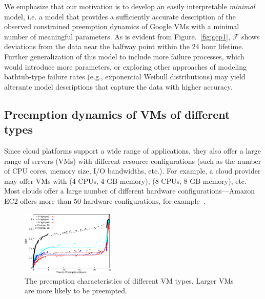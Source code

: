 We emphasize that our motivation is to develop an easily interpretable \emph{minimal} model, i.e. a model that provides a sufficiently accurate description of the observed constrained preemption dynamics of Google VMs with a minimal number of meaningful parameters.
As is evident from Figure.~\ref{fig:gcp1}, $\mathscr{F}$ shows deviations from the data near the halfway point within the 24 hour lifetime. Further generalization of this model to include more failure processes, which would introduce more parameters, or exploring other approaches of modeling bathtub-type failure rates (e.g., exponential Weibull distributions) \cite{mudholkar1993exponentiated,crevecoeur1993model} may yield alterante model descriptions that capture the data with higher accuracy. 



\subsection{Preemption dynamics of VMs of different types}
\label{subsec:types-dynamics}
Since cloud platforms support a wide range of applications, they also offer a large range of servers (VMs) with different resource configurations (such as the number of CPU cores, memory size, I/O bandwidths, etc.). 
For example, a cloud provider may offer VMs with (4 CPUs, 4 GB memory), (8 CPUs, 8 GB memory), etc.
Most clouds offer a large number of different hardware configurations---Amazon EC2 offers more than 50 hardware configurations, for example~\cite{amazon-ec2-instance-types}.

\begin{figure}
  \centering 
  \includegraphics[width=0.4\textwidth]{../graphs/scispot-fig-vm-types.eps}
  \caption{The preemption characteristics of different VM types. Larger VMs are more likely to be preempted.}
  \label{fig:cdf-comparison}
\end{figure}

